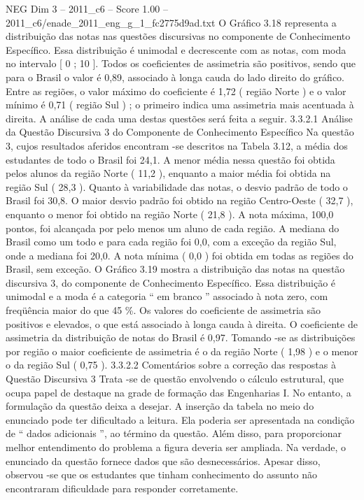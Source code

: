 \begin{textsample}{NEG Dim 3 – 2011\_c6 – Score 1.00 – 2011\_c6/enade\_2011\_eng\_g\_1\_fc2775d9ad.txt}
O Gráfico 3.18 representa a distribuição das notas nas questões discursivas no componente de Conhecimento Específico.
Essa distribuição é unimodal e decrescente com as notas, com moda no intervalo [ 0 ; 10 ].
Todos os coeficientes de assimetria são positivos, sendo que para o Brasil o valor é 0,89, associado à longa cauda do lado direito do gráfico.
Entre as regiões, o valor máximo do coeficiente é 1,72 ( região Norte ) e o valor mínimo é 0,71 ( região Sul ) ; o primeiro indica uma assimetria mais acentuada à direita.
A análise de cada uma destas questões será feita a seguir. 3.3.2.1 Análise da Questão Discursiva 3 do Componente de Conhecimento Específico Na questão 3, cujos resultados aferidos encontram -se descritos na Tabela 3.12, a média dos estudantes de todo o Brasil foi 24,1.
A menor média nessa questão foi obtida pelos alunos da região Norte ( 11,2 ), enquanto a maior média foi obtida na região Sul ( 28,3 ).
Quanto à variabilidade das notas, o desvio padrão de todo o Brasil foi 30,8.
O maior desvio padrão foi obtido na região Centro-Oeste ( 32,7 ), enquanto o menor foi obtido na região Norte ( 21,8 ).
A nota máxima, 100,0 pontos, foi alcançada por pelo menos um aluno de cada região.
A mediana do Brasil como um todo e para cada região foi 0,0, com a exceção da região Sul, onde a mediana foi 20,0.
A nota mínima ( 0,0 ) foi obtida em todas as regiões do Brasil, sem exceção.
O Gráfico 3.19 mostra a distribuição das notas na questão discursiva 3, do componente de Conhecimento Específico.
Essa distribuição é unimodal e a moda é a categoria “ em branco ” associado à nota zero, com freqüência maior do que 45 \%.
Os valores do coeficiente de assimetria são positivos e elevados, o que está associado à longa cauda à direita.
O coeficiente de assimetria da distribuição de notas do Brasil é 0,97.
Tomando -se as distribuições por região o maior coeficiente de assimetria é o da região Norte ( 1,98 ) e o menor o da região Sul ( 0,75 ). 3.3.2.2 Comentários sobre a correção das respostas à Questão Discursiva 3 Trata -se de questão envolvendo o cálculo estrutural, que ocupa papel de destaque na grade de formação das Engenharias I.
No entanto, a formulação da questão deixa a desejar.
A inserção da tabela no meio do enunciado pode ter dificultado a leitura.
Ela poderia ser apresentada na condição de “ dados adicionais ”, ao término da questão.
Além disso, para proporcionar melhor entendimento do problema a figura deveria ser ampliada.
Na verdade, o enunciado da questão fornece dados que são desnecessários.
Apesar disso, observou -se que os estudantes que tinham conhecimento do assunto não encontraram dificuldade para responder corretamente.

\end{textsample}
